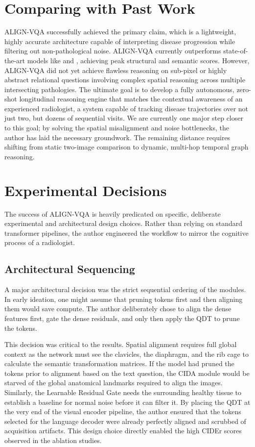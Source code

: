 \section{Comparing with Past Work}
ALIGN-VQA successfully achieved the primary claim, which is a lightweight, highly accurate architecture capable of interpreting disease progression while filtering out non-pathological noise. ALIGN-VQA currently outperforms state-of-the-art models like \cite{real} and \cite{plural}, achieving peak structural and semantic scores. However, ALIGN-VQA did not yet achieve flawless reasoning on sub-pixel or highly abstract relational questions involving complex spatial reasoning across multiple intersecting pathologies. The ultimate goal is to develop a fully autonomous, zero-shot longitudinal reasoning engine that matches the contextual awareness of an experienced radiologist, a system capable of tracking disease trajectories over not just two, but dozens of sequential visits. We are currently one major step closer to this goal; by solving the spatial misalignment and noise bottlenecks, the author has laid the necessary groundwork. The remaining distance requires shifting from static two-image comparison to dynamic, multi-hop temporal graph reasoning.

\section{Experimental Decisions}
The success of ALIGN-VQA is heavily predicated on specific, deliberate experimental and architectural design choices. Rather than relying on standard transformer pipelines, the author engineered the workflow to mirror the cognitive process of a radiologist.

\subsection{Architectural Sequencing}
A major architectural decision was the strict sequential ordering of the modules. In early ideation, one might assume that pruning tokens first and then aligning them would save compute. The author deliberately chose to align the dense features first, gate the dense residuals, and only then apply the QDT to prune the tokens.

This decision was critical to the results. Spatial alignment requires full global context as the network must see the clavicles, the diaphragm, and the rib cage to calculate the semantic transformation matrices. If the model had pruned the tokens prior to alignment based on the text question, the CIDA module would be starved of the global anatomical landmarks required to align the images. Similarly, the Learnable Residual Gate needs the surrounding healthy tissue to establish a baseline for normal noise before it can filter it. By placing the QDT at the very end of the visual encoder pipeline, the author ensured that the tokens selected for the language decoder were already perfectly aligned and scrubbed of acquisition artifacts. This design choice directly enabled the high CIDEr scores observed in the ablation studies.

